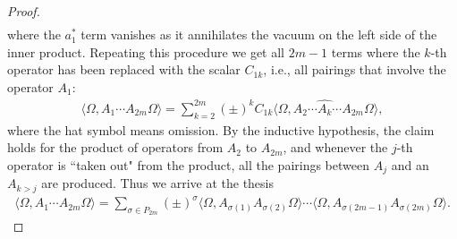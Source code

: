 \begin{proof}
\begin{align*}
	\end{align*}
	where the $a^*_1$ term vanishes as it annihilates the vacuum on the left side of the inner
	product. Repeating this procedure we get all $2m-1$ terms where the $k$-th operator
	has been replaced with the scalar $C_{1k}$, i.e., all pairings that involve the operator
	$A_1$:
	\begin{align*}
		\langle\Omega,A_1\cdots A_{2m}\Omega\rangle
		= \sum_{k=2}^{2m}(\pm)^k C_{1k}\langle\Omega,A_2\cdots \widehat{A_k}\cdots A_{2m}\Omega\rangle,
	\end{align*}
	where the hat symbol means omission. By the inductive hypothesis, the claim holds for the
	product of operators from $A_2$ to $A_{2m}$, and whenever the $j$-th operator is
	``taken out" from the product, all the pairings between $A_j$ and an $A_{k>j}$ are
	produced. Thus we arrive at the thesis
	\begin{align*}
		\langle\Omega,A_1\cdots A_{2m}\Omega\rangle
		= \sum_{\sigma\in P_{2m}}(\pm)^\sigma\langle\Omega,A_{\sigma(1)}A_{\sigma(2)}\Omega\rangle
		\cdots\langle\Omega,A_{\sigma(2m-1)}A_{\sigma(2m)}\Omega\rangle.
	\end{align*}
\end{proof}

% 

